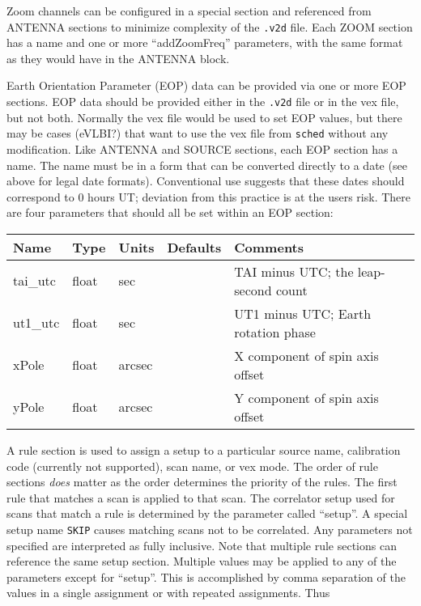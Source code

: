 Zoom channels can be configured in a special section and referenced from ANTENNA sections to minimize complexity of the {\tt .v2d} file.
Each ZOOM section has a name and one or more ``addZoomFreq'' parameters, with the same format as they would have in the ANTENNA block.

Earth Orientation Parameter (EOP) data can be provided via one or more EOP sections.
EOP data should be provided either in the {\tt .v2d} file or in the vex file, but not both.
Normally the vex file would be used to set EOP values, but there may be cases (eVLBI?) that want to use the vex file from {\tt sched} without any modification.
Like ANTENNA and SOURCE sections, each EOP section has a name.
The name must be in a form that can be converted directly to a date (see above for legal date formats).
Conventional use suggests that these dates should correspond to 0 hours UT; deviation from this practice is at the users risk.
There are four parameters that should all be set within an EOP section:

\begin{center}
\begin{tabular}{l l l l l}
\hline
Name		& Type	& Units		& Defaults	& Comments \\
\hline
tai\_utc	& float	& sec		&		& TAI minus UTC; the leap-second count  \\
ut1\_utc	& float	& sec		&		& UT1 minus UTC; Earth rotation phase \\
xPole		& float	& arcsec	&		& X component of spin axis offset \\
yPole		& float	& arcsec	&		& Y component of spin axis offset \\
\hline
\hline
\end{tabular}
\end{center}

A rule section is used to assign a setup to a particular source name, calibration code (currently not supported), scan name, or vex mode.
The order of rule sections {\em does} matter as the order determines the priority of the rules.
The first rule that matches a scan is applied to that scan.
The correlator setup used for scans that match a rule is determined by the parameter called ``setup''.
A special setup name {\tt SKIP} causes matching scans not to be correlated.
Any parameters not specified are interpreted as fully inclusive.
Note that multiple rule sections can reference the same setup section.
Multiple values may be applied to any of the parameters except for ``setup''.
This is accomplished by comma separation of the values in a single assignment or with repeated assignments.
Thus

